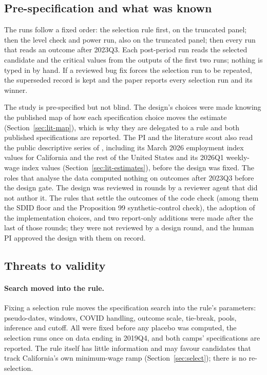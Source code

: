 \subsection{Pre-specification and what was known}
\label{sec:prespec}

The runs follow a fixed order: the selection rule first, on the truncated panel; then the level
check and power run, also on the truncated panel; then every run that reads an outcome after 2023Q3.
Each post-period run reads the selected candidate and the critical values from the outputs of the
first two runs; nothing is typed in by hand. If a reviewed bug fix forces the selection run to be
repeated, the superseded record is kept and the paper reports every selection run and its winner.

The study is pre-specified but not blind. The design's choices were made knowing the published map
of how each specification choice moves the estimate (Section~\ref{sec:lit-map}), which is why they
are delegated to a rule and both published specifications are reported. The PI and the literature
scout also read the public descriptive series of \citet{steier2026recordinglaw}, including its
March 2026 employment index values for California and the rest of the United States and its 2026Q1
weekly-wage index values (Section~\ref{sec:lit-estimates}), before the design was fixed. The roles
that analyse the data computed nothing on outcomes after 2023Q3 before the design gate. The design
was reviewed in \CrewRoundsDesign{} rounds by a reviewer agent that did not author it. The rules
that settle the outcomes of the code check (among them the SDID floor and the Proposition 99
synthetic-control check), the adoption of the implementation choices, and two report-only additions
were made after the last of those rounds; they were not
reviewed by a design round, and the human PI approved the design with them on record.

\subsection{Threats to validity}
\label{sec:threats}

\paragraph{Search moved into the rule.} Fixing a selection rule moves the specification search into
the rule's parameters: pseudo-dates, windows, COVID handling, outcome scale, tie-break, pools,
inference and cutoff. All were fixed before any placebo was computed, the selection runs once on
data ending in 2019Q4, and both camps' specifications are reported. The rule itself has little
information and may favour candidates that track California's own minimum-wage ramp
(Section~\ref{sec:select}); there is no re-selection.

